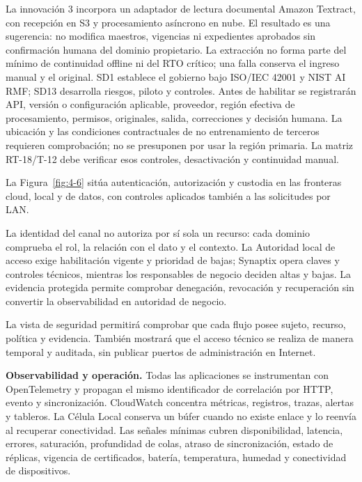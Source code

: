 La innovación 3 incorpora un adaptador de lectura documental Amazon Textract, con recepción en S3 y procesamiento asíncrono en nube. El resultado es una sugerencia: no modifica maestros, vigencias ni expedientes aprobados sin confirmación humana del dominio propietario. La extracción no forma parte del mínimo de continuidad offline ni del RTO crítico; una falla conserva el ingreso manual y el original. SD1 establece el gobierno bajo ISO/IEC 42001 y NIST AI RMF; SD13 desarrolla riesgos, piloto y controles. Antes de habilitar se registrarán API, versión o configuración aplicable, proveedor, región efectiva de procesamiento, permisos, originales, salida, correcciones y decisión humana. La ubicación y las condiciones contractuales de no entrenamiento de terceros requieren comprobación; no se presuponen por usar la región primaria. La matriz RT-18/T-12 debe verificar esos controles, desactivación y continuidad manual.


La Figura~\ref{fig:4-6} sitúa autenticación, autorización y custodia en las fronteras cloud, local y de datos, con controles aplicados también a las solicitudes por LAN.



La identidad del canal no autoriza por sí sola un recurso: cada dominio comprueba el rol, la relación con el dato y el contexto. La Autoridad local de acceso exige habilitación vigente y prioridad de bajas; Synaptix opera claves y controles técnicos, mientras los responsables de negocio deciden altas y bajas. La evidencia protegida permite comprobar denegación, revocación y recuperación sin convertir la observabilidad en autoridad de negocio.


La vista de seguridad permitirá comprobar que cada flujo posee sujeto, recurso, política y evidencia. También mostrará que el acceso técnico se realiza de manera temporal y auditada, sin publicar puertos de administración en Internet.

\textbf{Observabilidad y operación.} Todas las aplicaciones se instrumentan con OpenTelemetry y propagan el mismo identificador de correlación por HTTP, evento y sincronización. CloudWatch concentra métricas, registros, trazas, alertas y tableros. La Célula Local conserva un búfer cuando no existe enlace y lo reenvía al recuperar conectividad. Las señales mínimas cubren disponibilidad, latencia, errores, saturación, profundidad de colas, atraso de sincronización, estado de réplicas, vigencia de certificados, batería, temperatura, humedad y conectividad de dispositivos.

